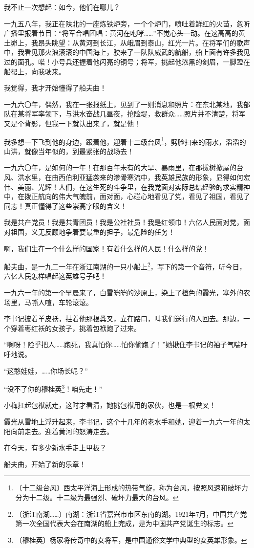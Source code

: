 \documentclass[12pt,UTF-8,openany]{ctexbook}
\begin{document}
\begin{large}
    我不止一次想起：如今，他们在哪儿？
    
    一九五八年，我正在陕北的一座炼铁炉旁，一个个炉门，喷吐着鲜红的火苗，忽听广播里报着节目：“将军合唱团唱：黄河在咆哮……”不觉心头一动。在这高高的黄土峁上，我昂头眺望：从黄河到长江，从峨眉到泰山，红光一片。在将军们的歌声中，我看见那火浪滚滚的中国海上，驶来了一队队威武的航船，船上面有许多我见过的面孔。喏！小号兵还握着他闪亮的铜号；将军，挑起他浓黑的剑眉，一脚蹬在船帮上，向我驶来。
    
    我觉得，我才开始懂得了船夫曲！
    
    一九六〇年，偶然，我在一张报纸上，见到了一则消息和照片：在东北某地，我部队在某将军率领下，与洪水奋战几昼夜，抢险堤，救群众……照片并不清楚，将军又是个背影，但我一下就认出来了，就是他！
    
    我多想一下飞到他的身边，跟着他，迎着十二级台风\footnote{〔十二级台风〕西太平洋海上形成的热带气旋，称为台风，按照风速和破坏力分为十二级。十二级为最强烈、破坏力最大的台风。}，劈脸扫来的雨水，滔滔的山洪，就像当年似的，到最紧张的战场去！
    
    一九六〇年，是如何的一年！在那百年未有的大旱、暴雨里，在那拔树掀屋的台风、洪水里，在由西伯利亚猛袭来的渗骨寒流中，我英雄民族的形象，显得如何宏伟、美丽、光辉！人们，在这生死的斗争里，在我党面对实际总结经验的求实精神中，在拨正航向的伟大气魄前，面对面，心碰心地看见了党，看见了祖国，看见了同志！真正懂得了这些崇高字眼的含义！
    
    我是共产党员！我是共青团员！我是公社社员！我是红领巾！六亿人民面对党，面对祖国，义无反顾地争着要最重的担子，最危险的任务！
    
    啊，我们生在一个什么样的国家！有着什么样的人民！什么样的党！
    
    船夫曲，是一九二一年在浙江南湖的一只小船上\footnote{〔浙江南湖……〕南湖：浙江省嘉兴市市区东南的湖。1921年7月，中国共产党第一次全国代表大会在南湖的船上完成，是为中国共产党诞生的标志。}，写下的第一个音符，听今日，六亿人民怎样唱起这英雄号子吧！
    
    一九六一年的第一个早晨来了，白雪皑皑的沙原上，染上了橙色的霞光，塞外的农场里，马嘶人喧，车轮滚滚。
    
    李书记披着羊皮袄，拄着他那根粪叉，立在路口，叫我们送行的人回去。那边，一个穿着枣红袄的女孩子，挑着包袱跑了过来。
    
    “啊呀！险乎把人……跑死，我真怕你……怕你偷跑了！”她揪住李书记的袖子气喘吁吁地说。
    
    “这憨娃娃，……你场长呢？”
    
    “没不了你的穆桂英\footnote{〔穆桂英〕杨家将传奇中的女将军，是中国通俗文学中典型的女英雄形象。}！咱先走！”
    
    小梅扛起包袱就走，这时才看清，她挑包袱用的家伙，也是一根粪叉！
    
    霞光从雪地上浮升起来，李书记，这个十几年的老水手和她，迎着一九六一年的太阳向前走去。迎着黄河的怒涛走去。
    
    在今天，有多少新水手走上甲板？
    
    船夫曲，开始了新的乐章！
    
\end{large}
\end{document}
